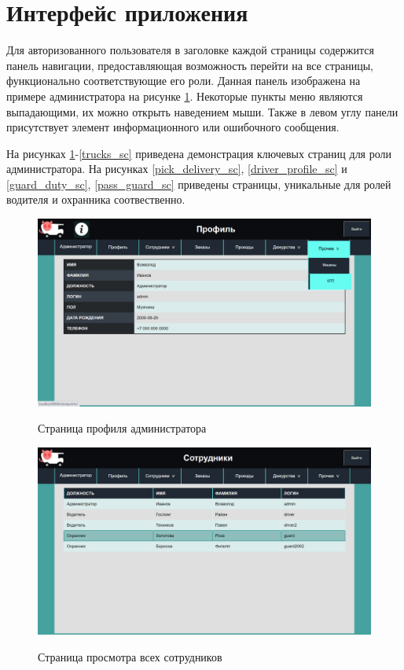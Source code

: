 \section{Интерфейс приложения}
Для авторизованного пользователя в заголовке каждой страницы содержится панель навигации, предоставляющая возможность перейти на все страницы, функционально соответствующие его роли. Данная панель изображена на примере администратора на рисунке \ref{navbar_sc}. Некоторые пункты меню являются выпадающими, их можно открыть наведением мыши. Также в левом углу панели присутствует элемент информационного или ошибочного сообщения.

На рисунках \ref{navbar_sc}-\ref{trucks_sc} приведена демонстрация ключевых страниц для роли администратора. На рисунках \ref{pick_delivery_sc}, \ref{driver_profile_sc} и \ref{guard_duty_sc}, \ref{pass_guard_sc} приведены страницы, уникальные для ролей водителя и охранника соотвественно.

\begin{figure}[h!] 
	\begin{center}
		{\includegraphics[scale=0.45, angle=0]{sc/admin_profile}}
		\caption{Страница профиля администратора}
		\label{navbar_sc}
	\end{center}
\end{figure}

\begin{figure}[h!] 
	\begin{center}
		{\includegraphics[scale=0.43, angle=0]{sc/all_profiles}}
		\caption{Страница просмотра всех сотрудников}
		\label{all_profiles_sc}
	\end{center}
\end{figure}

